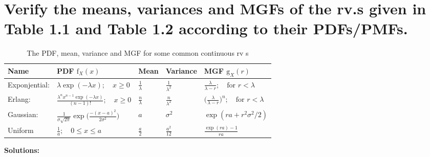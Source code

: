 \documentclass[UTF8]{article}
\begin{document}
    \section{Verify the means, variances and MGFs of the rv.s given in Table 1.1 and Table 1.2 according to their PDFs/PMFs.}
    \begin{table}[h]
        \centering
        \caption{The PDF, mean, variance and MGF for some common continuous rv s}
        \begin{spacing}{2.0}
            \begin{tabular}{lllll}
                \hline
                Name & PDF $\text{f}_X(x)$ & Mean & Variance & MGF $\text{g}_X(r)$\\
                \hline
                Exponjential: & $\lambda\exp(-\lambda x);\quad x\geq0$ & $\frac{1}{\lambda}$ & $\frac{1}{\lambda^2}$ & $\frac{\lambda}{\lambda-r};\quad\text{for }r<\lambda$\\
                Erlang: & $\frac{\lambda^nx^{n-1}\exp(-\lambda x)}{(n-1)!};\quad x\geq0$ & $\frac{n}{\lambda}$ & $\frac{n}{\lambda^2}$ & $\big(\frac{\lambda}{\lambda-r}\big)^n;\quad\text{for }r<\lambda$\\
                Gaussian: & $\frac{1}{\sigma\sqrt{2\pi}}\exp\big(\frac{-(x-a)^2}{2\sigma^2}\big)$ & $a$ & $\sigma^2$ & $\exp(ra+r^2\sigma^2/2)$\\
                Uniform & $\frac{1}{a};\quad0\leq x\leq a$ & $\frac{a}{2}$ & $\frac{a^2}{12}$ & $\frac{\exp(ra)-1}{ra}$\\
                \hline
            \end{tabular}    
        \end{spacing}
    \end{table}


    \textbf{Solutions:}
    
\end{document}
